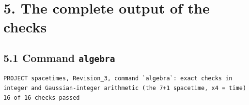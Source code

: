 \documentclass[
  10pt,
]{article}
\begin{document}
\hypertarget{the-complete-output-of-the-checks}{%
\section{5. The complete output of the
checks}\label{the-complete-output-of-the-checks}}

\hypertarget{command-algebra}{%
\subsection{\texorpdfstring{5.1 Command
\texttt{algebra}}{5.1 Command algebra}}\label{command-algebra}}

\begin{verbatim}
PROJECT spacetimes, Revision_3, command `algebra`: exact checks in integer and Gaussian-integer arithmetic (the 7+1 spacetime, x4 = time)
16 of 16 checks passed


\end{verbatim}
\end{document}
